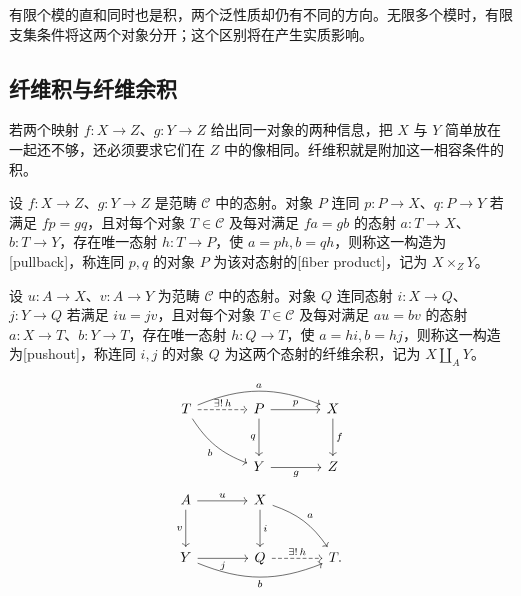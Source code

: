有限个模的直和同时也是积，两个泛性质却仍有不同的方向。无限多个模时，有限支集条件将这两个对象分开；这个区别将在产生实质影响。

\subsection{纤维积与纤维余积}
\label{b4:subsec:0201:02}

若两个映射 \(f:X\rightarrow Z\)、\(g:Y\rightarrow Z\) 给出同一对象的两种信息，把 \(X\) 与 \(Y\) 简单放在一起还不够，还必须要求它们在 \(Z\) 中的像相同。纤维积就是附加这一相容条件的积。

\begin{definition}[纤维积与纤维余积]\label{b4:def:pullback-pushout}
	设 \(f:X\rightarrow Z\)、\(g:Y\rightarrow Z\) 是范畴 \(\mathcal C\) 中的态射。对象 \(P\) 连同 \(p:P\rightarrow X\)、\(q:P\rightarrow Y\) 若满足 \(fp=gq\)，且对每个对象 \(T\in\mathcal C\) 及每对满足 \(fa=gb\) 的态射 \(a:T\rightarrow X\)、\(b:T\rightarrow Y\)，存在唯一态射 \(h:T\rightarrow P\)，使 \(a=ph,b=qh\)，则称这一构造为[pullback]，称连同 \(p,q\) 的对象 \(P\) 为该对态射的[fiber product]，记为 \(X\times_ZY\)。

	\ProseParagraphBreak
	设 \(u:A\rightarrow X\)、\(v:A\rightarrow Y\) 为范畴 \(\mathcal C\) 中的态射。对象 \(Q\) 连同态射 \(i:X\rightarrow Q\)、\(j:Y\rightarrow Q\) 若满足 \(iu=jv\)，且对每个对象 \(T\in\mathcal C\) 及每对满足 \(au=bv\) 的态射 \(a:X\rightarrow T\)、\(b:Y\rightarrow T\)，存在唯一态射 \(h:Q\rightarrow T\)，使 \(a=hi,b=hj\)，则称这一构造为[pushout]，称连同 \(i,j\) 的对象 \(Q\) 为这两个态射的纤维余积，记为 \(X\amalg_A Y\)。
\end{definition}

\[
	\begin{tikzcd}[column sep=large,row sep=large]
		T\arrow[r,dashed,"\exists!\,h"]\arrow[rr,bend left=22,"a"] \arrow[dr,bend right=18,"b"']&P\arrow[r,"p"]\arrow[d,"q"']&X\arrow[d,"f"]\\
		&Y\arrow[r,"g"']&Z
	\end{tikzcd}
\]
\[
	\begin{tikzcd}[column sep=large,row sep=large]
		A\arrow[r,"u"]\arrow[d,"v"']&X\arrow[d,"i"]\arrow[dr,bend left=18,"a"]&\\
		Y\arrow[r,"j"']\arrow[rr,bend right=22,"b"']&Q\arrow[r,dashed,"\exists!\,h"]&T.
	\end{tikzcd}
\]

